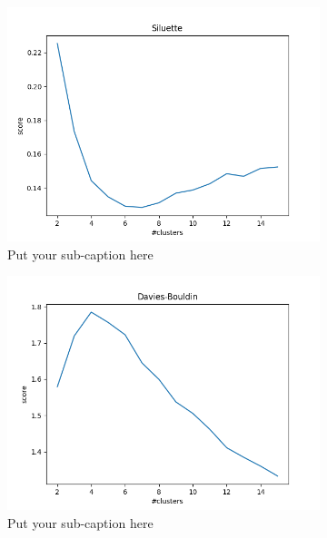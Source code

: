 \documentclass{article}
\begin{document}
\begin{figure}[ht]
\begin{subfigure}{.33\textwidth}
  \centering
  \includegraphics[width=1\linewidth]{1d/Dogs/siluette dog.png}  
  \caption{Put your sub-caption here}
  \label{fig:sub-first}
\end{subfigure}
\begin{subfigure}{.33\textwidth}
  \centering
  \includegraphics[width=1\linewidth]{1d/Dogs/Davies_dog.png}  
  \caption{Put your sub-caption here}
  \label{fig:sub-second}
\end{subfigure}
\begin{subfigure}{.33\textwidth}
  \centering

\end{subfigure}
\end{figure}
\end{document}
